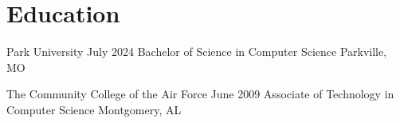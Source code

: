 \section{Education}

\resumeSubheading
  {Park University}
  {July 2024}
  {Bachelor of Science in Computer Science}
  {Parkville, MO}

\resumeSubheading
  {The Community College of the Air Force}
  {June 2009}
  {Associate of Technology in Computer Science}
  {Montgomery, AL}
